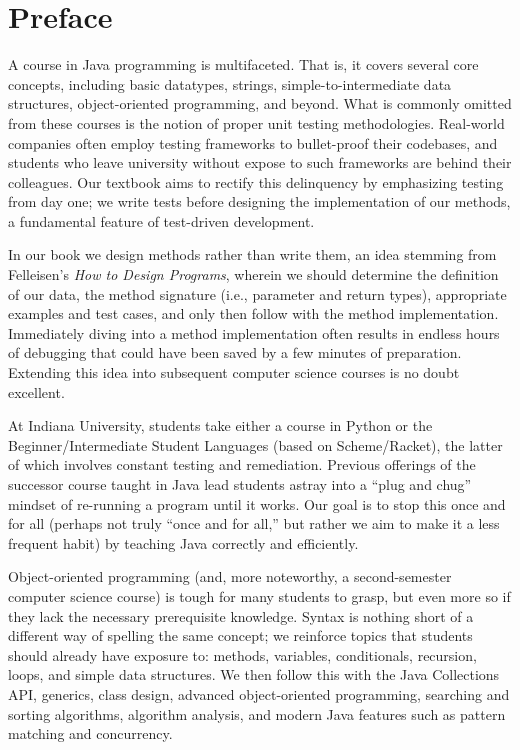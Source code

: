 \chapter*{Preface}

A course in Java programming is multifaceted. That is, it covers several core concepts, including basic datatypes, strings, simple-to-intermediate data structures, object-oriented programming, and beyond. What is commonly omitted from these courses is the notion of proper unit testing methodologies. Real-world companies often employ testing frameworks to bullet-proof their codebases, and students who leave university without expose to such frameworks are behind their colleagues. Our textbook aims to rectify this delinquency by emphasizing testing from day one; we write tests before designing the implementation of our methods, a fundamental feature of test-driven development.

In our book we design methods rather than write them, an idea stemming from Felleisen's \emph{How to Design Programs}, wherein we should determine the definition of our data, the method signature (i.e., parameter and return types), appropriate examples and test cases, and only then follow with the method implementation. Immediately diving into a method implementation often results in endless hours of debugging that could have been saved by a few minutes of preparation. Extending this idea into subsequent computer science courses is no doubt excellent.

At Indiana University, students take either a course in Python or the Beginner/Intermediate Student Languages (based on Scheme/Racket), the latter of which involves constant testing and remediation. Previous offerings of the successor course taught in Java lead students astray into a ``plug and chug'' mindset of re-running a program until it works. Our goal is to stop this once and for all (perhaps not truly ``once and for all,'' but rather we aim to make it a less frequent habit) by teaching Java correctly and efficiently. 

Object-oriented programming (and, more noteworthy, a second-semester computer science course) is tough for many students to grasp, but even more so if they lack the necessary prerequisite knowledge. Syntax is nothing short of a different way of spelling the same concept; we reinforce topics that students should already have exposure to: methods, variables, conditionals, recursion, loops, and simple data structures. We then follow this with the Java Collections API, generics, class design, advanced object-oriented programming, searching and sorting algorithms, algorithm analysis, and modern Java features such as pattern matching and concurrency. 

